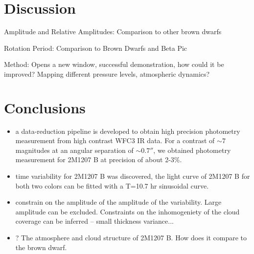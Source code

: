 \documentclass[apj]{emulateapj}
\begin{document}




\section{Discussion}
Amplitude and Relative Amplitudes: Comparison to other brown dwarfs

Rotation Period: Comparison to Brown Dwarfs and Beta Pic

Method: Opens a new window, successful demonstration, how could it be improved?
Mapping different pressure levels, atmospheric dynamics?

\section{Conclusions}
\begin{itemize}
\item a data-reduction pipeline is developed to obtain high precision
  photometry measurement from high contrast WFC3 IR data. For a
  contrast of $\sim 7$ magnitudes at an angular separation of
  $\sim0.7''$, we obtained photometry measurement for 2M1207 B at
  precision of about 2-3\%. 
\item time variability for 2M1207 B was discovered, the light curve of
  2M1207 B for both two colors can be fitted with a T=10.7 hr
  sinusoidal curve.
\item constrain on the amplitude of the amplitude of the
  variability. Large amplitude can be excluded. Constraints on the
  inhomogeniety of the cloud coverage can be inferred -- small
  thickness variance...
\item ? The atmosphere and cloud structure of 2M1207 B. How does it
  compare to the brown dwarf.
\end{itemize}



\end{document}
